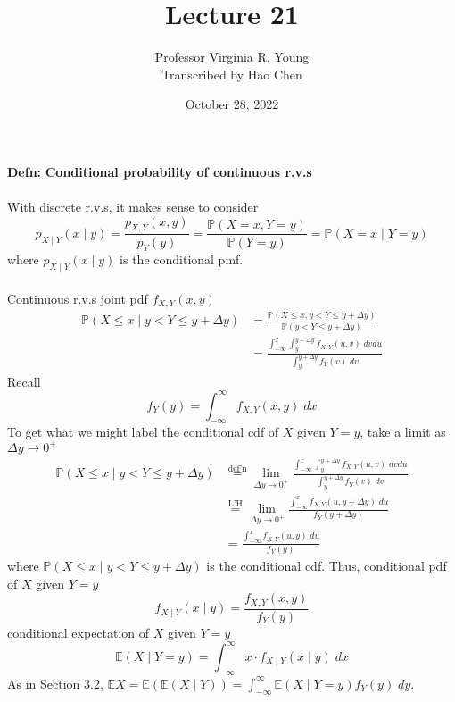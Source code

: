 \documentclass[a4paper]{article}
\title{Lecture 21}
\author{Professor Virginia R. Young\\ \small{Transcribed by Hao Chen}}
\date{October 28, 2022}
\newcommand{\n}{\hfill\break}
\newcommand{\defn}[1]{\par\noindent\settowidth{\hangindent}{\textbf{Defn: }}\textbf{Defn: }#1\n}
\newcommand{\Prob}{\mathbb{P}}
\renewcommand{\P}{\Prob}
\newcommand{\Avg}{\mathbb{E}}
\newcommand{\E}{\Avg}
\begin{document}
\maketitle

\defn{
    \textbf{Conditional probability of continuous r.v.s}
    \\\\
    With discrete r.v.s, it makes sense to consider
    \[p_{X\mid Y}(x\mid y)=\frac{p_{X,Y}(x,y)}{p_Y(y)}=\frac{\P(X=x, Y=y)}{\P(Y=y)}=\P(X=x\mid Y=y)\]
    where $p_{X\mid Y}(x\mid y)$ is the conditional pmf.
    \\\\
    Continuous r.v.s joint pdf $f_{X,Y}(x,y)$
    \begin{align*}
        \P(X\leq x\mid y<Y\leq y+\Delta y) &= \frac{\P(X\leq x, y<Y\leq y+\Delta y)}{\P(y<Y\leq y+\Delta y)} \\
        &= \frac{\int^x_{-\infty}\int^{y+\Delta y}_y f_{X,Y}(u,v)\;dvdu}{\int^{y+\Delta y}_y f_Y(v)\;dv}
    \end{align*}
    Recall 
    \[f_Y(y)=\int^\infty_{-\infty}f_{X,Y}(x,y)\;dx\]
    To get what we might label the conditional cdf of $X$ given $Y=y$, take a limit as $\Delta y\rightarrow0^+$
    \begin{align*}
        \P(X\leq x\mid y<Y\leq y+\Delta y) &\overset{\text{def'n}}{=} \lim_{\Delta y\rightarrow0^+} \frac{\int^x_{-\infty}\int^{y+\Delta y}_y f_{X,Y}(u,v)\;dvdu}{\int^{y+\Delta y}_y f_Y(v)\;dv} \\
        &\overset{\text{L'H}}{=} \lim_{\Delta y\rightarrow0^+}\frac{\int^x_{-\infty} f_{X,Y}(u,y+\Delta y)\;du}{f_Y(y+\Delta y)} \\
        &= \frac{\int^x_{-\infty} f_{X,Y}(u,y)\;du}{f_Y(y)}
    \end{align*}
    where $\P(X\leq x\mid y<Y\leq y+\Delta y)$ is the conditional cdf. Thus, conditional pdf of $X$ given $Y=y$
    \[f_{X\mid Y}(x\mid y)=\frac{f_{X,Y}(x,y)}{f_Y(y)}\]
    conditional expectation of $X$ given $Y=y$
    \[\E(X\mid Y=y)=\int_{-\infty}^\infty x\cdot f_{X\mid Y}(x\mid y)\;dx\]
    As in Section 3.2, $\E X=\E(\E(X\mid Y))=\int_{-\infty}^\infty\E(X\mid Y=y)f_Y(y)\;dy$.
}
\end{document}
